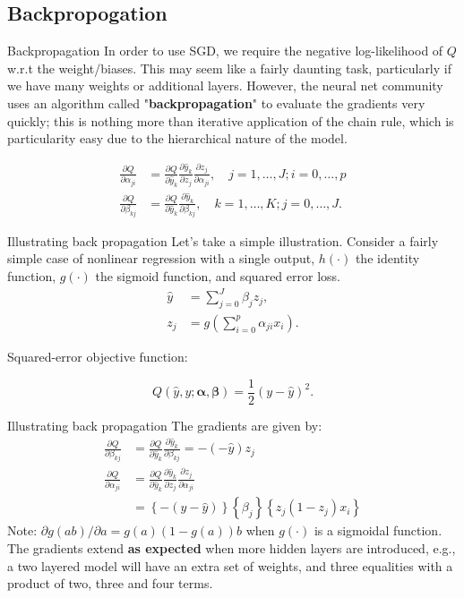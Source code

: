 \documentclass{beamer}
\begin{document}
\subsection{Backpropogation}
\begin{frame}{Backpropagation}
In order to use SGD, we require the negative log-likelihood of $Q$ w.r.t the weight/biases. This may seem like a fairly daunting task, particularly if we have many weights or additional layers. However,  the neural net community uses an algorithm called "\textbf{backpropagation}" to evaluate the gradients very quickly; this is nothing more than iterative application of the chain rule, which is particularity easy due to the hierarchical nature of the model.

$$
\begin{aligned}
\frac{\partial Q}{\partial \alpha_{j i}} & =\frac{\partial Q}{\partial \hat{y}_{k}} \frac{\partial \hat{y}_{k}}{\partial z_{j}} \frac{\partial z_{j}}{\partial \alpha_{j i}}, \quad j=1, \ldots, J ; i=0, \ldots, p \\
\frac{\partial Q}{\partial \beta_{k j}} & =\frac{\partial Q}{\partial \hat{y}_{k}} \frac{\partial \hat{y}_{k}}{\partial \beta_{k j}}, \quad k=1, \ldots, K ; j=0, \ldots, J.
\end{aligned}
$$
\end{frame}
\begin{frame}{Illustrating back propagation}
Let's take a simple illustration. Consider a fairly simple case of nonlinear regression with a single output, $h(\cdot)$ the identity function, $g(\cdot)$ the sigmoid function, and squared error loss.
\begin{align}
\hat{y} & =\sum_{j=0}^{J} \beta_{j} z_{j}, \\
z_{j} & =g\left(\sum_{i=0}^{p} \alpha_{j i} x_{i}\right).
\end{align}


Squared-error objective function:

$$
Q(\hat{{y}},{y}; \boldsymbol{\alpha}, \boldsymbol{\beta})=\frac{1}{2} \left({y}-\hat{y}\right)^{2}.
$$
\end{frame}
\begin{frame}{Illustrating back propagation}
The gradients are given by:
\begin{align}
 \frac{\partial Q}{\partial \beta_{k j}}&=\frac{\partial Q}{\partial \hat{y}_{k}} \frac{\partial \hat{y}_{k}}{\partial \beta_{k j}}=-\left(-\hat{y}\right) z_{j} \\
\frac{\partial Q}{\partial \alpha_{j i}} & =\frac{\partial Q}{\partial \hat{y}_{k}} \frac{\partial \hat{y}_{k}}{\partial z_{j}} \frac{\partial z_{j}}{\partial \alpha_{j i}}\nonumber \\
& =\left\{-\left(y-\hat{y}\right)\right\}\left\{\beta_{j}\right\}\left\{z_{j}\left(1-z_{j}\right) x_{i}\right\}
\end{align}
Note: $\partial g(a b) / \partial a=g(a)(1-g(a)) b$ when $g(\cdot)$ is a sigmoidal function.\\
The gradients extend \textbf{as expected} when more hidden layers are introduced, e.g., a two layered model will have an extra set of weights, and three equalities with a product of two, three and four terms.
\end{frame}
\end{document}

